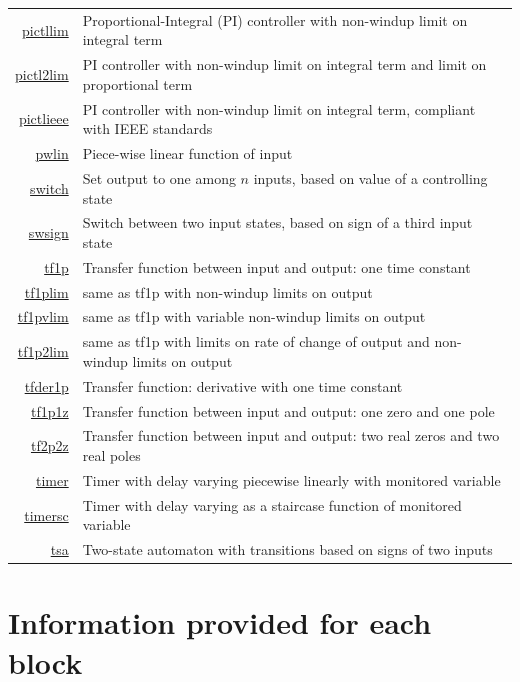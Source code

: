 \begin{table}[h!]
\begin{tabular}{|rl|}
\hyperlink{link_to_pictllim}{pictllim} & Proportional-Integral (PI) controller with non-windup limit on integral term \\
\hyperlink{link_to_pictl2lim}{pictl2lim} & PI controller with non-windup limit on integral term and limit on proportional term \\
\hyperlink{link_to_pictlieee}{pictlieee} & PI controller with non-windup limit on integral term, compliant with IEEE standards \\
\hyperlink{link_to_pwlin}{pwlin} & Piece-wise linear function of input \\
\hyperlink{link_to_switch}{switch} & Set output to one among $n$ inputs, based on value of a controlling state \\
\hyperlink{link_to_swsign}{swsign} & Switch between two input states, based on sign of a third input state \\
\hyperlink{link_to_tf1p}{tf1p} & Transfer function between input and output: one time constant \\
\hyperlink{link_to_tf1plim}{tf1plim} & same as tf1p with non-windup limits on output \\
\hyperlink{link_to_tf1pvlim}{tf1pvlim} & same as tf1p with variable non-windup limits on output \\
\hyperlink{link_to_tf1p2lim}{tf1p2lim} & same as tf1p with limits on rate of change of output and non-windup limits on output \\
\hyperlink{link_to_tfder1p}{tfder1p} & Transfer function: derivative with one time constant \\
\hyperlink{link_to_tf1p1z}{tf1p1z} & Transfer function between input and output: one zero and one pole \\
\hyperlink{link_to_tf2p2z}{tf2p2z} & Transfer function between input and output: two real zeros and two real poles \\
\hyperlink{link_to_timer}{timer} & Timer with delay varying piecewise linearly with monitored variable \\
\hyperlink{link_to_timersc}{timersc} & Timer with delay varying as a staircase function of monitored variable  \\
\hyperlink{link_to_tsa}{tsa} & Two-state automaton with transitions based on signs of two inputs \\
\hline
\end{tabular}
\end{table}

\section{Information provided for each block}

